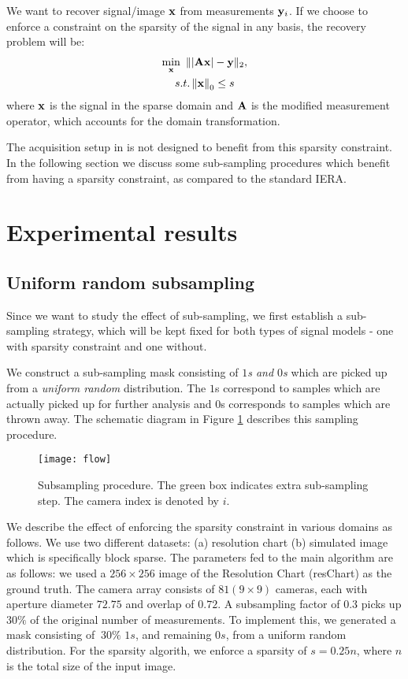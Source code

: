 \documentclass{article} %
\begin{document}
We want to recover signal/image $\mathbf{x}$ from measurements $\mathbf{y}_i$. If we choose to enforce a constraint on the sparsity of the signal in any basis, the recovery problem will be:
\begin{gather} \label{eq:ls}
\min_{\mathbf{x}} ~ \||\mathbf{A} \mathbf{x}| - \mathbf{y}\|_2, \\
s.t. \left\| {\mathbf{x}} \right\|_0 \leq s
\end{gather}
where $\mathbf{x}$ is the signal in the sparse domain and $\mathbf{A}$ is the modified measurement operator, which accounts for the domain transformation.

The acquisition setup in \cite{holloway2016toward} is not designed to benefit from this sparsity constraint. In the following section we discuss some sub-sampling procedures which benefit from having a sparsity constraint, as compared to the standard IERA.

\section{Experimental results} \label{sec:exp}
 
\subsection{Uniform random subsampling} \label{subsec:exp1}
Since we want to study the effect of sub-sampling, we first establish a sub-sampling strategy, which will be kept fixed for both types of signal models - one with sparsity constraint and one without.

We construct a sub-sampling mask consisting of\textit{ $1$s and $0$s }which are picked up from a \textit{uniform random} distribution. The $1$s correspond to samples which are actually picked up for further analysis and $0$s corresponds to samples which are thrown away. The schematic diagram in Figure \ref{fig:flow} describes this sampling procedure.

\begin{figure}[!t]	
	\centering
	\texttt{[image: flow]}
	\caption{Subsampling procedure. The green box indicates extra sub-sampling step. The camera index is denoted by $i$.}
	\label{fig:flow}
\end{figure}

We describe the effect of enforcing the sparsity constraint in various domains as follows. We use two different datasets: (a) resolution chart (b) simulated image which is specifically block sparse. The parameters fed to the main algorithm are as follows: we used a $256\times256$ image of the Resolution Chart (resChart) as the ground truth. The camera array consists of $81 (9\times 9)$ cameras, each with aperture diameter $72.75$ and overlap of $0.72$. A subsampling factor of $0.3$ picks up $30\%$ of the original number of measurements. To implement this, we generated a mask consisting of $~30\%$ $1s$, and remaining $0s$, from a uniform random distribution. For the sparsity algorith, we enforce a sparsity of $s=0.25n$, where $n$ is the total size of the input image. 
\end{document}
